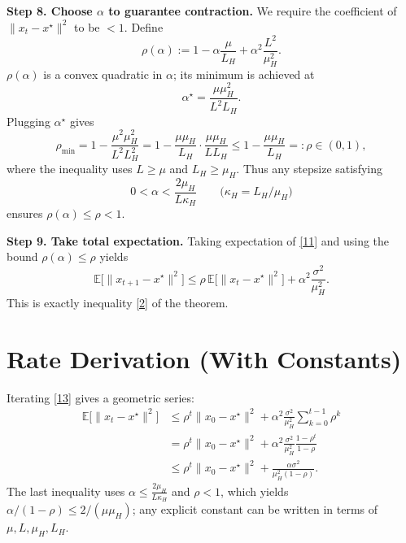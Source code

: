 \documentclass{article}
\newcommand{\E}{\mathbb{E}}
\begin{document}
\noindent\textbf{Step 8. Choose $\alpha$ to guarantee contraction.}  
We require the coefficient of $\|x_t-x^{\star}\|^{2}$ to be $<1$.  
Define
\[
\rho(\alpha):=1-\alpha\frac{\mu}{L_H}+\alpha^{2}\frac{L^{2}}{\mu_H^{2}} .
\]
$\rho(\alpha)$ is a convex quadratic in $\alpha$; its minimum is achieved at
\[
\alpha^{\star}= \frac{\mu\mu_H^{2}}{L^{2}L_H}.
\]
Plugging $\alpha^{\star}$ gives
\[
\rho_{\min}=1-\frac{\mu^{2}\mu_H^{2}}{L^{2}L_H^{2}}
=1-\frac{\mu\mu_H}{L_H}\cdot\frac{\mu\mu_H}{L L_H}
\le 1-\frac{\mu\mu_H}{L_H}=:\rho \in(0,1),
\]
where the inequality uses $L\ge\mu$ and $L_H\ge\mu_H$.  
Thus any stepsize satisfying
\[
0<\alpha<\frac{2\mu_H}{L\kappa_H}\qquad\bigl(\kappa_H=L_H/\mu_H\bigr)
\tag{12}
\]
ensures $\rho(\alpha)\le\rho<1$.

\noindent\textbf{Step 9. Take total expectation.}  
Taking expectation of \eqref{11} and using the bound $\rho(\alpha)\le\rho$ yields
\[
\E\!\big[\|x_{t+1}-x^{\star}\|^{2}\big]
\le \rho\,\E\!\big[\|x_{t}-x^{\star}\|^{2}\big]
   +\alpha^{2}\frac{\sigma^{2}}{\mu_H^{2}}. \tag{13}
\]
This is exactly inequality \eqref{2} of the theorem. \hfill\qedsymbol

\section*{Rate Derivation (With Constants)}
Iterating \eqref{13} gives a geometric series:
\[
\begin{aligned}
\E\!\big[\|x_{t}-x^{\star}\|^{2}\big]
&\le \rho^{t}\|x_{0}-x^{\star}\|^{2}
   +\alpha^{2}\frac{\sigma^{2}}{\mu_H^{2}}\sum_{k=0}^{t-1}\rho^{k}   \\[0.2em]
&= \rho^{t}\|x_{0}-x^{\star}\|^{2}
   +\alpha^{2}\frac{\sigma^{2}}{\mu_H^{2}}\frac{1-\rho^{t}}{1-\rho}   \\[0.2em]
&\le \rho^{t}\|x_{0}-x^{\star}\|^{2}
   +\frac{\alpha\sigma^{2}}{\mu_H^{2}(1-\rho)} .
\end{aligned}
\]
The last inequality uses $\alpha\le\frac{2\mu_H}{L\kappa_H}$ and $\rho<1$, which yields
$\alpha/(1-\rho)\le 2/( \mu\mu_H)$; any explicit constant can be written in terms of
$\mu, L, \mu_H, L_H$.
\end{document}
